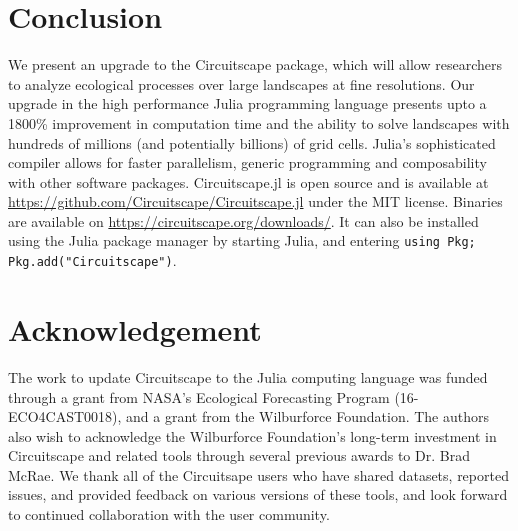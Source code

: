 \documentclass{juliacon}
\begin{document}

\section{Conclusion}
We present an upgrade to the Circuitscape package, which will allow researchers to analyze ecological processes over large landscapes at fine resolutions. Our upgrade in the high performance Julia programming language presents upto a 1800\% improvement in computation time and the ability to solve landscapes with hundreds of millions (and potentially billions) of grid cells. Julia’s sophisticated compiler allows for faster parallelism, generic programming and composability with other software packages. Circuitscape.jl is open source and is available at \url{https://github.com/Circuitscape/Circuitscape.jl} under the MIT license. Binaries are available on \url{https://circuitscape.org/downloads/}. It can also be installed using the Julia package manager by starting Julia, and entering \texttt{using Pkg; Pkg.add("Circuitscape")}. 

\section{Acknowledgement}
The work to update Circuitscape to the Julia computing language was funded through a grant from NASA’s Ecological Forecasting Program (16-ECO4CAST0018), and a grant from the Wilburforce Foundation.  The authors also wish to acknowledge the Wilburforce Foundation’s long-term investment in Circuitscape and related tools through several previous awards to Dr. Brad McRae.  We thank all of the Circuitsape users who have shared datasets, reported issues, and provided feedback on various versions of these tools, and look forward to continued collaboration with the user community. 


\end{document}
